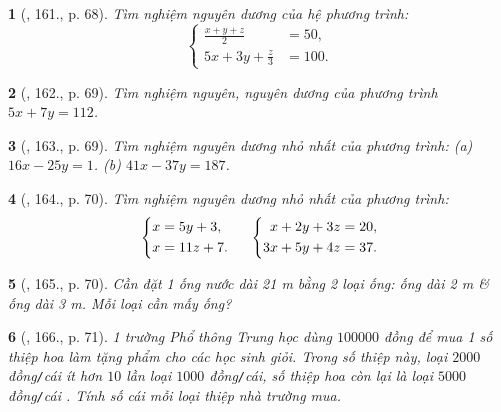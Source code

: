 \documentclass{article}
\newtheorem{baitoan}{}
\begin{document}
\begin{baitoan}[\cite{Dong_23_1001_toan_I}, 161., p. 68]
	Tìm nghiệm nguyên dương của hệ phương trình:
	\begin{equation*}
		\left\{\begin{split}
			\frac{x + y + z}{2} &= 50,\\
			5x + 3y + \frac{z}{3} &= 100.
		\end{split}\right.
	\end{equation*}
\end{baitoan}

\begin{baitoan}[\cite{Dong_23_1001_toan_I}, 162., p. 69]
	Tìm nghiệm nguyên, nguyên dương của phương trình $5x + 7y = 112$.
\end{baitoan}

\begin{baitoan}[\cite{Dong_23_1001_toan_I}, 163., p. 69]
	Tìm nghiệm nguyên dương nhỏ nhất của phương trình: (a) $16x - 25y = 1$. (b) $41x - 37y = 187$.
\end{baitoan}

\begin{baitoan}[\cite{Dong_23_1001_toan_I}, 164., p. 70]
	Tìm nghiệm nguyên dương nhỏ nhất của phương trình:
	\begin{equation*}
		\left\{\begin{split}
			x &= 5y + 3,\\
			x &= 11z + 7.
		\end{split}\right.\hspace{5mm}\left\{\begin{split}
			x + 2y + 3z &= 20,\\
			3x + 5y + 4z &= 37.
		\end{split}\right.
	\end{equation*}
\end{baitoan}

\begin{baitoan}[\cite{Dong_23_1001_toan_I}, 165., p. 70]
	Cần đặt 1 ống nước dài {\rm21 m} bằng 2 loại ống: ống dài {\rm2 m} \& ống dài {\rm3 m}. Mỗi loại cần mấy ống?
\end{baitoan}

\begin{baitoan}[\cite{Dong_23_1001_toan_I}, 166., p. 71]
	1 trường Phổ thông Trung học dùng $100000$ đồng để mua 1 số thiệp hoa làm tặng phẩm cho các học sinh giỏi. Trong số thiệp này, loại $2000$ đồng{\tt/}cái ít hơn $10$ lần loại $1000$ đồng{\tt/}cái, số thiệp hoa còn lại là loại $5000$ đồng{\tt/}cái . Tính số cái mỗi loại thiệp nhà trường mua.
\end{baitoan}
\end{document}
